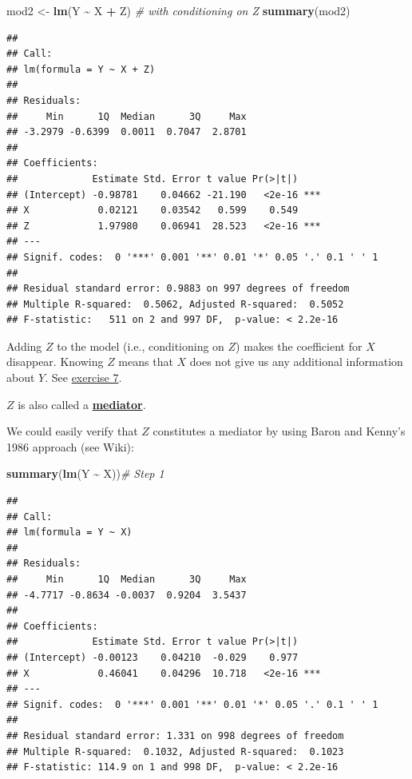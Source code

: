 \documentclass[
]{book}
\newenvironment{Shaded}{\begin{snugshade}}{\end{snugshade}}
\newcommand{\CommentTok}[1]{\textcolor[rgb]{0.56,0.35,0.01}{\textit{#1}}}
\newcommand{\FunctionTok}[1]{\textcolor[rgb]{0.13,0.29,0.53}{\textbf{#1}}}
\newcommand{\NormalTok}[1]{#1}
\newcommand{\OtherTok}[1]{\textcolor[rgb]{0.56,0.35,0.01}{#1}}
\newcommand{\SpecialCharTok}[1]{\textcolor[rgb]{0.81,0.36,0.00}{\textbf{#1}}}
\begin{document}
\begin{Shaded}
\begin{Highlighting}[]
\NormalTok{mod2 }\OtherTok{\textless{}{-}} \FunctionTok{lm}\NormalTok{(Y }\SpecialCharTok{\textasciitilde{}}\NormalTok{ X }\SpecialCharTok{+}\NormalTok{ Z) }\CommentTok{\# with conditioning on Z}
\FunctionTok{summary}\NormalTok{(mod2)}
\end{Highlighting}
\end{Shaded}

\begin{verbatim}
## 
## Call:
## lm(formula = Y ~ X + Z)
## 
## Residuals:
##     Min      1Q  Median      3Q     Max 
## -3.2979 -0.6399  0.0011  0.7047  2.8701 
## 
## Coefficients:
##             Estimate Std. Error t value Pr(>|t|)    
## (Intercept) -0.98781    0.04662 -21.190   <2e-16 ***
## X            0.02121    0.03542   0.599    0.549    
## Z            1.97980    0.06941  28.523   <2e-16 ***
## ---
## Signif. codes:  0 '***' 0.001 '**' 0.01 '*' 0.05 '.' 0.1 ' ' 1
## 
## Residual standard error: 0.9883 on 997 degrees of freedom
## Multiple R-squared:  0.5062, Adjusted R-squared:  0.5052 
## F-statistic:   511 on 2 and 997 DF,  p-value: < 2.2e-16
\end{verbatim}

Adding \(Z\) to the model (i.e., conditioning on \(Z\)) makes the coefficient for \(X\) disappear.
Knowing \(Z\) means that \(X\) does not give us any additional information about \(Y\).
See \hyperref[exercise7_multiple_regression]{exercise 7}.

\(Z\) is also called a \href{https://en.wikipedia.org/wiki/Mediation_(statistics)}{\textbf{mediator}}.

We could easily verify that \(Z\) constitutes a mediator by using Baron and
Kenny's 1986 approach (see Wiki):

\begin{Shaded}
\begin{Highlighting}[]
\FunctionTok{summary}\NormalTok{(}\FunctionTok{lm}\NormalTok{(Y }\SpecialCharTok{\textasciitilde{}}\NormalTok{ X))}\CommentTok{\# Step 1}
\end{Highlighting}
\end{Shaded}

\begin{verbatim}
## 
## Call:
## lm(formula = Y ~ X)
## 
## Residuals:
##     Min      1Q  Median      3Q     Max 
## -4.7717 -0.8634 -0.0037  0.9204  3.5437 
## 
## Coefficients:
##             Estimate Std. Error t value Pr(>|t|)    
## (Intercept) -0.00123    0.04210  -0.029    0.977    
## X            0.46041    0.04296  10.718   <2e-16 ***
## ---
## Signif. codes:  0 '***' 0.001 '**' 0.01 '*' 0.05 '.' 0.1 ' ' 1
## 
## Residual standard error: 1.331 on 998 degrees of freedom
## Multiple R-squared:  0.1032, Adjusted R-squared:  0.1023 
## F-statistic: 114.9 on 1 and 998 DF,  p-value: < 2.2e-16
\end{verbatim}
\end{document}
